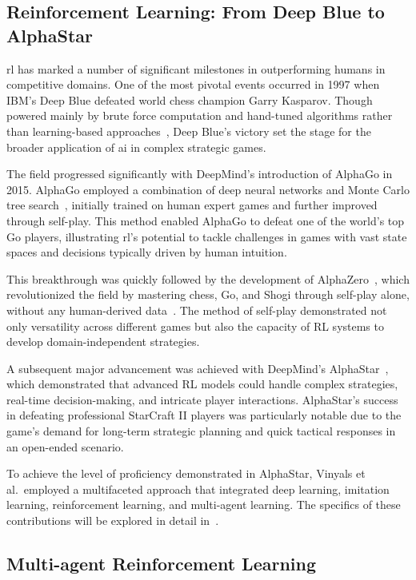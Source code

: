     \subsection*{Reinforcement Learning: From Deep Blue to AlphaStar}

\Gls{rl} has marked a number of significant milestones in outperforming humans in 
competitive domains. One of the most pivotal events occurred in 1997 
when IBM's Deep Blue defeated world chess champion Garry Kasparov. 
Though powered mainly by brute force computation and hand-tuned algorithms
rather than learning-based approaches~\cite{campbell2002}, Deep Blue's victory set 
the stage for the broader application of \gls{ai} in complex strategic games.

The field progressed significantly with DeepMind's introduction of AlphaGo in 2015. AlphaGo 
employed a combination of deep neural networks and Monte Carlo tree search~\cite{silver2016},
initially trained on human expert games and further improved through self-play.
This method enabled AlphaGo to defeat one of the world's top Go players, illustrating \gls{rl}'s
potential to tackle challenges in games with vast state spaces and decisions typically driven by
human intuition.

This breakthrough was quickly followed by the development of AlphaZero~\cite{silver2017},
which revolutionized the field by mastering chess, Go, and Shogi through self-play alone,
without any human-derived data~\cite{silver2017a}.
The method of self-play demonstrated not only versatility across different games but also the
capacity of RL systems to develop domain-independent strategies.

A subsequent major advancement was achieved with DeepMind's AlphaStar~\cite{vinyals2019},
which demonstrated that advanced RL models could handle complex strategies,
real-time decision-making, and intricate player interactions. AlphaStar's success in 
defeating professional StarCraft II players was particularly notable due to the game's demand 
for long-term strategic planning and quick tactical responses in an open-ended scenario.

To achieve the level of proficiency demonstrated in AlphaStar, Vinyals et al.~employed a 
multifaceted approach that integrated deep learning, imitation learning, reinforcement learning, 
and multi-agent learning. The specifics of these contributions will be explored in 
detail in~.


    \subsection*{Multi-agent Reinforcement Learning}%

